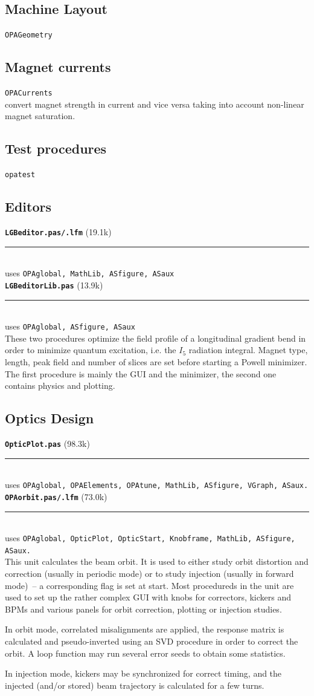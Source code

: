 \documentclass[12pt]{article}
\newcommand\code[1]{{\tt #1}}
\newcommand{\unico}[1]{{\color{burntorange}\code{#1}}}
\newcommand{\opagui}[1]{\colorbox{blue!20}{\code{#1}}}
\newcommand{\oguih}[2]{\subsection{\label{#2}#1}{\Huge\opagui{#2}}\\}
\newcommand{\opauni}[1]{\colorbox{orange!30}{\code{#1}}}
\newcommand{\ounih}[2]{\subsection{\label{#2}#1}{\Huge\opauni{#2}}\\}
\newcommand\opamodule[3]{{\bf \tt #1} #2\\  \rule[3pt]{\textwidth}{0.2pt} \\ {\scriptsize uses \tt  #3}\\[1ex]}
\begin{document}
\oguih{Machine Layout}{OPAGeometry}

\oguih{Magnet currents}{OPACurrents}

\unico{getKfromI, getdKdIfac, getIfromK} convert  magnet strength in current and vice versa taking into account non-linear magnet saturation.

\ounih{Test procedures}{opatest} 





\subsection{Editors}



\opamodule{LGBeditor.pas/.lfm}{(19.1k)}{OPAglobal,  MathLib, ASfigure, ASaux}
\opamodule{LGBeditorLib.pas}{(13.9k)}{OPAglobal, ASfigure, ASaux}
These two procedures optimize the field profile of a longitudinal gradient bend in order to minimize quantum excitation, i.e. the $I_5$ radiation integral. Magnet type, length, peak field and number of slices are set before starting a Powell minimizer. The first procedure is mainly the GUI and the minimizer, the second one contains physics and plotting.

\subsection{Optics Design}


\opamodule{OpticPlot.pas}{(98.3k)}{OPAglobal, OPAElements, OPAtune, MathLib, ASfigure, VGraph, ASaux.}

\opamodule{OPAorbit.pas/.lfm}{(73.0k)}{OPAglobal, OpticPlot,  OpticStart, Knobframe, MathLib, ASfigure, ASaux.}
This unit calculates the beam orbit. It is used to either study orbit distortion and correction (usually in periodic mode) or to study injection (usually in forward mode)~-- a corresponding flag is set at start. Most procedureds in the unit are used to set up the rather complex GUI with knobs for correctors, kickers and BPMs and various panels for orbit correction, plotting or injection studies.

In orbit mode, correlated misalignments are applied, the response matrix is calculated and pseudo-inverted using an SVD procedure in order to correct the orbit. A loop function may run several error seeds to obtain some statistics.

In injection mode, kickers may be synchronized for correct timing, and the injected (and/or stored) beam trajectory is calculated for a few turns.
\end{document}
